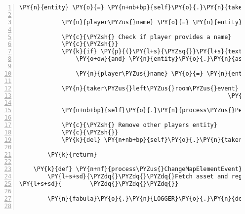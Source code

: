 \begin{Verbatim}[commandchars=\\\{\},numbers=left,firstnumber=1,stepnumber=1]
            \PY{n}{entity} \PY{o}{=} \PY{n+nb+bp}{self}\PY{o}{.}\PY{n}{taker\PYZus{}in\PYZus{}room\PYZus{}dict}\PY{p}{[}\PY{n}{event}\PY{o}{.}\PY{n}{identifier}\PY{p}{]}

            \PY{n}{player\PYZus{}name} \PY{o}{=} \PY{n}{entity}\PY{o}{.}\PY{n}{identifier}

            \PY{c}{\PYZsh{} Check if player provides a name}
            \PY{c}{\PYZsh{}}
            \PY{k}{if} \PY{p}{(}\PY{l+s}{\PYZsq{}}\PY{l+s}{text/plain}\PY{l+s}{\PYZsq{}} \PY{o+ow}{in} \PY{n}{entity}\PY{o}{.}\PY{n}{assets}\PY{o}{.}\PY{n}{keys}\PY{p}{(}\PY{p}{)}
                \PY{o+ow}{and} \PY{n}{entity}\PY{o}{.}\PY{n}{assets}\PY{p}{[}\PY{l+s}{\PYZsq{}}\PY{l+s}{text/plain}\PY{l+s}{\PYZsq{}}\PY{p}{]}\PY{o}{.}\PY{n}{data} \PY{o+ow}{is} \PY{o+ow}{not} \PY{n+nb+bp}{None}\PY{p}{)}\PY{p}{:}

                \PY{n}{player\PYZus{}name} \PY{o}{=} \PY{n}{entity}\PY{o}{.}\PY{n}{assets}\PY{p}{[}\PY{l+s}{\PYZsq{}}\PY{l+s}{text/plain}\PY{l+s}{\PYZsq{}}\PY{p}{]}\PY{o}{.}\PY{n}{data}\PY{p}{[}\PY{l+m+mi}{0}\PY{p}{]}

            \PY{n}{taker\PYZus{}left\PYZus{}room\PYZus{}event} \PY{o}{=} \PY{n}{fabula}\PY{o}{.}\PY{n}{PerceptionEvent}\PY{p}{(}\PY{n+nb+bp}{self}\PY{o}{.}\PY{n}{host}\PY{o}{.}\PY{n}{client\PYZus{}id}\PY{p}{,}
                                                           \PY{n+nb+bp}{self}\PY{o}{.}\PY{n}{taker\PYZus{}left\PYZus{}room\PYZus{}msg}\PY{o}{.}\PY{n}{format}\PY{p}{(}\PY{n}{player\PYZus{}name}\PY{p}{)}\PY{p}{)}

            \PY{n+nb+bp}{self}\PY{o}{.}\PY{n}{process\PYZus{}PerceptionEvent}\PY{p}{(}\PY{n}{taker\PYZus{}left\PYZus{}room\PYZus{}event}\PY{p}{)}

            \PY{c}{\PYZsh{} Remove other players entity}
            \PY{c}{\PYZsh{}}
            \PY{k}{del} \PY{n+nb+bp}{self}\PY{o}{.}\PY{n}{taker\PYZus{}in\PYZus{}room\PYZus{}dict}\PY{p}{[}\PY{n}{event}\PY{o}{.}\PY{n}{identifier}\PY{p}{]}

        \PY{k}{return}

    \PY{k}{def} \PY{n+nf}{process\PYZus{}ChangeMapElementEvent}\PY{p}{(}\PY{n+nb+bp}{self}\PY{p}{,} \PY{n}{event}\PY{p}{)}\PY{p}{:}
        \PY{l+s+sd}{\PYZdq{}\PYZdq{}\PYZdq{}Fetch asset and register/replace tile.}
\PY{l+s+sd}{        \PYZdq{}\PYZdq{}\PYZdq{}}

        \PY{n}{fabula}\PY{o}{.}\PY{n}{LOGGER}\PY{o}{.}\PY{n}{debug}\PY{p}{(}\PY{l+s}{\PYZdq{}}\PY{l+s}{called}\PY{l+s}{\PYZdq{}}\PY{p}{)}


\end{Verbatim}
